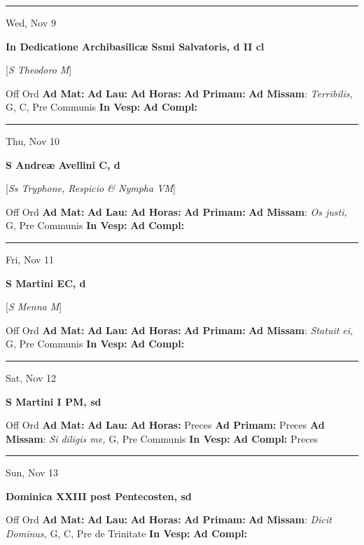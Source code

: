 \documentclass[letterpaper, 10pt]{article}
\begin{document}
\hrule
\begin{center}
Wed, Nov 9
\end{center}\textbf{ \large In Dedicatione Archibasilicæ Ssmi Salvatoris, \textnormal{\normalsize d II cl}}

[\textit{S Theodoro M}]
\begin{justify}
Off Ord
\textbf{Ad Mat: }
\textbf{Ad Lau: }
\textbf{Ad Horas: }
\textbf{Ad Primam: }
\textbf{Ad Missam}: \textit{Terribilis,} G, C, Pre Communis
\textbf{In Vesp: }
\textbf{Ad Compl: }\end{justify}



\hrule
\begin{center}
Thu, Nov 10
\end{center}\textbf{ \large S Andreæ Avellini C, \textnormal{\normalsize d}}

[\textit{Ss Tryphone, Respicio \& Nympha VM}]
\begin{justify}
Off Ord
\textbf{Ad Mat: }
\textbf{Ad Lau: }
\textbf{Ad Horas: }
\textbf{Ad Primam: }
\textbf{Ad Missam}: \textit{Os justi,} G, Pre Communis
\textbf{In Vesp: }
\textbf{Ad Compl: }\end{justify}



\hrule
\begin{center}
Fri, Nov 11
\end{center}\textbf{ \large S Martini  EC, \textnormal{\normalsize d}}

[\textit{S Menna M}]
\begin{justify}
Off Ord
\textbf{Ad Mat: }
\textbf{Ad Lau: }
\textbf{Ad Horas: }
\textbf{Ad Primam: }
\textbf{Ad Missam}: \textit{Statuit ei,} G, Pre Communis
\textbf{In Vesp: }
\textbf{Ad Compl: }\end{justify}



\hrule
\begin{center}
Sat, Nov 12
\end{center}\textbf{ \large S Martini I PM, \textnormal{\normalsize sd}}
\begin{justify}
Off Ord
\textbf{Ad Mat: }
\textbf{Ad Lau: }
\textbf{Ad Horas: }Preces
\textbf{Ad Primam: }Preces
\textbf{Ad Missam}: \textit{Si diligis me,} G, Pre Communis
\textbf{In Vesp: }
\textbf{Ad Compl: }Preces\end{justify}



\hrule
\begin{center}
Sun, Nov 13
\end{center}\textbf{ \large Dominica XXIII post Pentecosten, \textnormal{\normalsize sd}}
\begin{justify}
Off Ord
\textbf{Ad Mat: }
\textbf{Ad Lau: }
\textbf{Ad Horas: }
\textbf{Ad Primam: }
\textbf{Ad Missam}: \textit{Dicit Dominus,} G, C, Pre de Trinitate
\textbf{In Vesp: }
\textbf{Ad Compl: }\end{justify}
\end{document}
